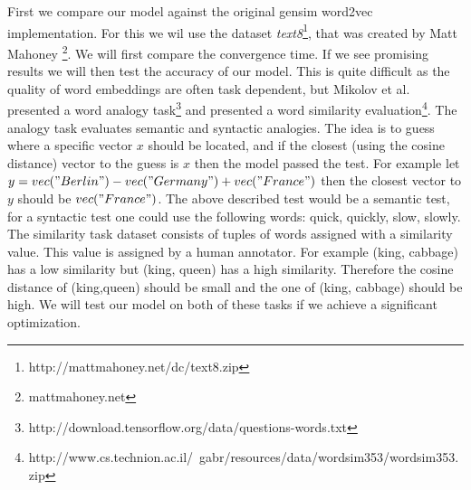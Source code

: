 First we compare our model against the original gensim word2vec implementation. For this we wil use the dataset \textit{text8}\footnote{ http://mattmahoney.net/dc/text8.zip }, that was created by Matt Mahoney \footnote{mattmahoney.net}. We will first compare the convergence time. If we see promising results we will then test the accuracy of our model. This is quite difficult as the quality of word embeddings are often task dependent, but Mikolov et al. \cite{mikolov2} presented a word analogy task\footnote{http://download.tensorflow.org/data/questions-words.txt} and  \cite{wSimilarity} presented a  word similarity evaluation\footnote{http://www.cs.technion.ac.il/~gabr/resources/data/wordsim353/wordsim353.zip}. The analogy task evaluates semantic and syntactic analogies. The idea is to guess where a specific vector $x$ should be located, and if the closest (using the cosine distance) vector to the guess is $x$ then the model passed the test. For example let $y = vec("Berlin") - vec("Germany") + vec("France")$ then the closest vector to $y$ should be $vec("France")$. The above described test would be a semantic test, for a syntactic test one could use the following words: quick, quickly, slow, slowly. The similarity task dataset consists of tuples of words assigned with a similarity value. This value is assigned by a human annotator. For example (king, cabbage) has a low similarity but (king, queen) has a high similarity. Therefore the cosine distance of (king,queen) should be small and the one of (king, cabbage) should be high. We will test our model on both of these tasks if we achieve a significant optimization. 

